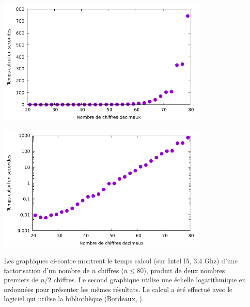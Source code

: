 \begin{minipage}{0.5\textwidth}
  \begin{center}
    \includegraphics[width=0.8\textwidth]{images/facto.pdf}

    \includegraphics[width=0.8\textwidth]{images/factolog.pdf}
  \end{center}
\end{minipage}
\begin{minipage}{0.5\textwidth}
  Les graphiques ci-contre montrent le temps calcul (sur Intel
    I5, 3,4 Ghz)
  d'une factorisation 
  d'un nombre de $n$ chiffres ($n\leq 80$), produit de deux nombres
  premiers de $n/2$ chiffres. Le second graphique utilise une échelle
  logarithmique en 
  ordonnées pour présenter les mêmes résultats. Le calcul a été
    effectué avec le logiciel  \cite{sagemath}  qui utilise la
    bibliothèque  (Bordeaux, \cite{Pari}).
\end{minipage}

